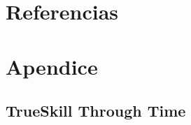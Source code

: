 \documentclass[a4paper,10pt]{book}
\makeatletter
\renewcommand{\frontmatter}{\cleardoublepage\@mainmatterfalse}
\theoremstyle{definition}
\newif\ifen
\newif\ifes
\newcommand{\en}[1]{\ifen#1\fi}
\newcommand{\es}[1]{\ifes#1\fi}
\makeatother
\begin{document}
\frontmatter
\chapter{Referencias}





\chapter{Apendice} \label{app:technical}

\section{TrueSkill Through Time}

\subsection{\en{Skill evolution}}\label{sec:appendix_skill_evolution}
\end{document}

